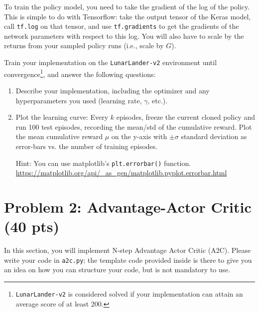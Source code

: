\documentclass[12pt]{article}
\begin{document}
To train the policy model, you need to take the gradient of the log of the policy. This is simple to do with Tensorflow: take the output tensor of the Keras model, call \texttt{tf.log} on that tensor, and use \texttt{tf.gradients} to get the gradients of the network parameters with respect to this log. You will also have to scale by the returns from your sampled policy runs (i.e., scale by $G$).

Train your implementation on the \texttt{LunarLander-v2} environment until convergence\footnote{\texttt{LunarLander-v2} is considered solved if your implementation can attain an average score of at least 200.}, and answer the following questions:

\begin{enumerate}
\item Describe your implementation, including the optimizer and any hyperparameters you used (learning rate, $\gamma$, etc.).

\item  Plot the learning curve: Every $k$ episodes, freeze the current cloned policy and run 100 test episodes, recording the mean/std of the cumulative reward. Plot the mean cumulative reward $\mu$ on the y-axis with $\pm \sigma$ standard deviation as error-bars vs. the number of training episodes.

Hint: You can use matplotlib's \texttt{plt.errorbar()} function. \url{https://matplotlib.org/api/\_as\_gen/matplotlib.pyplot.errorbar.html}
\end{enumerate}

\section*{Problem 2: Advantage-Actor Critic (40 pts)}

In this section, you will implement N-step Advantage Actor Critic (A2C). Please write your code in \texttt{a2c.py}; the template code provided inside is there to give you an idea on how you can structure your code, but is not mandatory to use.
\end{document}
